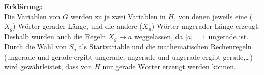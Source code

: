 	\textbf{Erklärung:}\\
	Die Variablen von $G$ werden zu je zwei Variablen in $H$, von denen jeweils eine ($X_g$) Wörter gerader Länge, und die andere ($X_u$) Wörter ungerader Länge erzeugt. Deshalb wurden auch die Regeln $X_g\rightarrow a$ weggelassen, da $|a|=1$ ungerade ist. Durch die Wahl von $S_g$ als Startvariable und die mathematischen Rechenregeln (ungerade und gerade ergibt ungerade, ungerade und ungerade ergibt gerade,\ldots) wird gewährleistet, dass von $H$ nur gerade Wörter erzeugt werden können.
